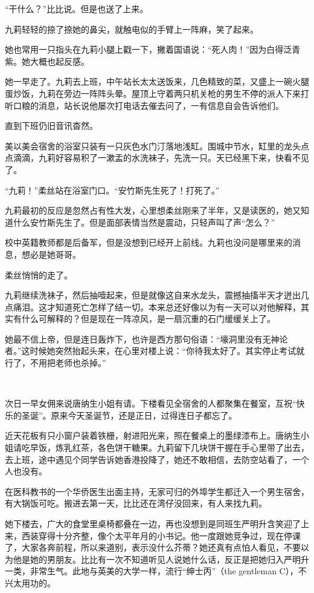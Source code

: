 \par “干什么？”比比说。但是也送了上来。
\par 九莉轻轻的捺了捺她的鼻尖，就触电似的手臂上一阵麻，笑了起来。
\par 她也常用一只指头在九莉小腿上戳一下，撇着国语说：“死人肉！”因为白得泛青紫。她大概也起反感。
\par 她一早走了。九莉去上班，中午站长太太送饭来，几色精致的菜，又盛上一碗火腿蛋炒饭，九莉在旁边一阵阵头晕。屋顶上守着两只机关枪的男生不停的派人下来打听口粮的消息，站长说他屡次打电话去催去问了，一有信息自会告诉他们。
\par 直到下班仍旧音讯杳然。
\par 美以美会宿舍的浴室只装有一只灰色水门汀落地浅缸。围城中节水，缸里的龙头点点滴滴，九莉好容易积了一漱盂的水洗袜子，先洗一只。天已经黑下来，快看不见了。
\par “九莉！”柔丝站在浴室门口。“安竹斯先生死了！打死了。”
\par 九莉最初的反应是忽然占有性大发，心里想柔丝刚来了半年，又是读医的，她又知道什么安竹斯先生了。但是面部表情当然是震动，只轻声叫了声“怎么？”
\par 校中英籍教师都是后备军，但是没想到已经开上前线。九莉也没问是哪里来的消息，想必是她哥哥。
\par 柔丝悄悄的走了。
\par 九莉继续洗袜子，然后抽噎起来，但是就像这自来水龙头，震撼抽搐半天才迸出几点痛泪。这才知道死亡怎样了结一切。本来总还好像以为有一天可以对他解释，其实有什么可解释的？但是现在一阵凉风，是一扇沉重的石门缓缓关上了。
\par 她最不信上帝，但是连日轰炸下，也许是西方那句俗语：“壕洞里没有无神论者。”这时候她突然抬起头来，在心里对楼上说：“你待我太好了。其实停止考试就行了，不用把老师也杀掉。”
\par  
\par 次日一早女佣来说唐纳生小姐有请。下楼看见全宿舍的人都聚集在餐室，互祝“快乐的圣诞”。原来今天圣诞节，还是正日，过得连日子都忘了。
\par 近天花板有只小窗户装着铁栅，射进阳光来，照在餐桌上的墨绿漆布上。唐纳生小姐请吃早饭，炼乳红茶，各色饼干糖果。九莉留下几块饼干握在手心里带了出去，去上班，途中遇见个同学告诉她香港投降了，她还不敢相信，去防空站看了，一个人也没有。
\par 在医科教书的一个华侨医生出面主持，无家可归的外埠学生都迁入一个男生宿舍，有大锅饭可吃。搬进去第一天，比比还在湾仔没回来，有人来找九莉。
\par 她下楼去，广大的食堂里桌椅都叠在一边，再也没想到是同班生严明升含笑迎了上来，西装穿得十分齐整，像个太平年月的小书记。他一度跟她竞争过，现在停课了，大家各奔前程，所以来道别，表示没什么芥蒂？她还真有点怕人看见，不要以为他是她的男朋友。比比有一次不知道听见人说她什么话，反正是把她归入严明升一类，非常生气。此地与英美的大学一样，流行“绅士丙”（the gentleman C），不兴太用功的。
